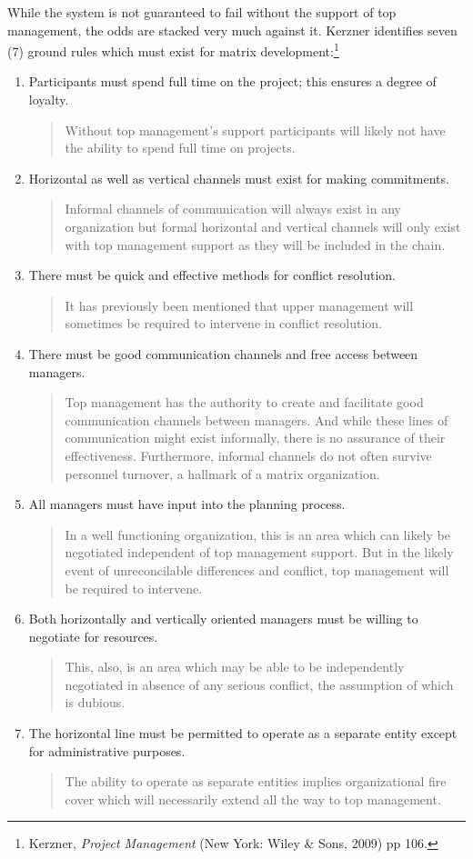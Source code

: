 \documentclass[letterpaper,10pt]{article}
\begin{document}
While the system is not guaranteed to fail without the support of top management, the odds are stacked very much against it.  Kerzner identifies seven (7) ground rules which must exist for matrix development:\footnote{Kerzner, \emph{Project Management} (New York: Wiley \& Sons, 2009) pp 106.}
\begin{enumerate}
\item Participants must spend full time on the project; this ensures a degree of loyalty.
\begin{quote}Without top management's support participants will likely not have the ability to spend full time on projects. \end{quote}
\item Horizontal as well as vertical channels must exist for making commitments.
\begin{quote}Informal channels of communication will always exist in any organization but formal horizontal and vertical channels will only exist with top management support as they will be included in the chain.  \end{quote}
\item There must be quick and effective methods for conflict resolution.
\begin{quote}It has previously been mentioned that upper management will sometimes be required to intervene in conflict resolution.\end{quote}
\item There must be good communication channels and free access between managers.
\begin{quote}Top management has the authority to create and facilitate good communication channels between managers.  And while these lines of communication might exist informally, there is no assurance of their effectiveness.  Furthermore, informal channels do not often survive personnel turnover, a hallmark of a matrix organization.\end{quote}
\item All managers must have input into the planning process.
\begin{quote}In a well functioning organization, this is an area which can likely be negotiated independent of top management support.  But in the likely event of unreconcilable differences and conflict, top management will be required to intervene.\end{quote}
\item Both horizontally and vertically oriented managers must be willing to negotiate for resources.
\begin{quote}This, also, is an area which may be able to be independently negotiated in absence of any serious conflict, the assumption of which is dubious.\end{quote}
\item The horizontal line must be permitted to operate as a separate entity except for administrative purposes.
\begin{quote}The ability to operate as separate entities implies organizational fire cover which will necessarily extend all the way to top management.\end{quote}
\end{enumerate}
\end{document}
